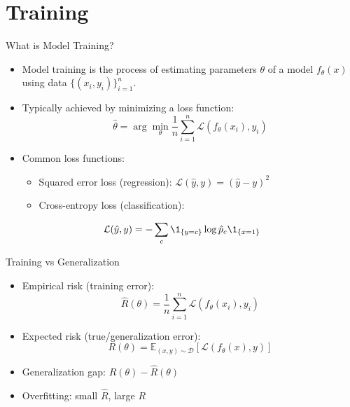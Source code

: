 \documentclass[aspectratio=169]{beamer}
\begin{document}
\section{Training}
\label{sec:org8a5192f}
\begin{frame}[label={sec:org2f736fd}]{What is Model Training?}
\begin{itemize}
\item Model training is the process of estimating parameters \(\theta\) of a model \(f_\theta(x)\) using data \(\{(x_i, y_i)\}_{i=1}^n\).
\item Typically achieved by minimizing a loss function:
\begin{equation}
\hat{\theta} = \arg\min_\theta \frac{1}{n} \sum_{i=1}^n \mathcal{L}(f_\theta(x_i), y_i)
\end{equation}
\item Common loss functions:
\begin{itemize}
\item \alert{\alert{Squared error loss}} (regression): \(\mathcal{L}(\hat{y}, y) = (\hat{y} - y)^2\)
\item \alert{\alert{Cross-entropy loss}} (classification):
\end{itemize}
\end{itemize}
\begin{equation}
    \mathcal{L}(\hat{y}, y) = -\sum_{c} \1_{\{y = c\}} \log \hat{p}_c
\1_{\{x = 1\}}
\end{equation}
\end{frame}



\begin{frame}[label={sec:org4a97d31}]{Training vs Generalization}
\begin{itemize}
\item \alert{\alert{Empirical risk}} (training error):
\begin{equation}
\hat{R}(\theta) = \frac{1}{n} \sum_{i=1}^n \mathcal{L}(f_\theta(x_i), y_i)
\end{equation}
\item \alert{\alert{Expected risk}} (true/generalization error):
\begin{equation}
R(\theta) = \mathbb{E}_{(x,y) \sim \mathcal{D}} \left[ \mathcal{L}(f_\theta(x), y) \right]
\end{equation}
\item Generalization gap: \(R(\theta) - \hat{R}(\theta)\)
\item Overfitting: small \(\hat{R}\), large \(R\)
\end{itemize}
\end{frame}
\end{document}
